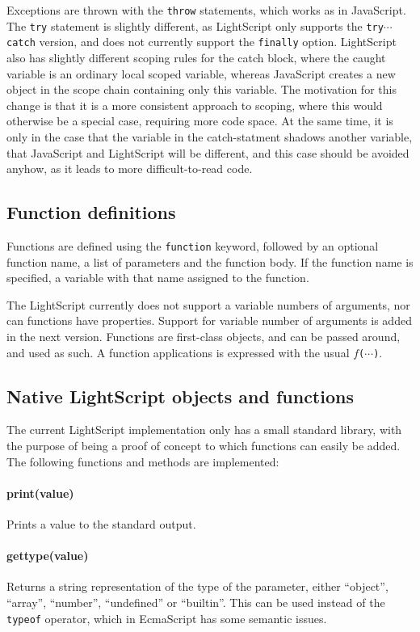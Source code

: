 \documentclass[11pt]{report}
\begin{document}
Exceptions are thrown with the \verb|throw| statements, which works as in JavaScript.
The \verb|try| statement is slightly different, as LightScript only supports the \verb|try|$\cdots$\verb|catch| version, and does not currently support the \verb|finally| option.
LightScript also has slightly different scoping rules for the catch block, where the caught variable is an ordinary local scoped variable, whereas JavaScript creates a new object in the scope chain containing only this variable. The motivation for this change is that it is a more consistent approach to scoping, where this would otherwise be a special case, requiring more code space. 
At the same time, it is only in the case that the variable in the catch-statment shadows another variable, that JavaScript and LightScript will be different, and this case should be avoided anyhow, as it leads to more difficult-to-read code. 

\subsection{Function definitions}
Functions are defined using the \verb|function| keyword, followed by an optional function name, a list of parameters and the function body.
If the function name is specified, a variable with that name assigned to the function.

The LightScript currently does not support a variable numbers of arguments, nor can functions have properties.
Support for variable number of arguments is added in the next version.
Functions are first-class objects, and can be passed around, and used as such. A function applications is expressed with the usual $f$\verb|(|$\cdots$\verb|)|.

\subsection{Native LightScript objects and functions}
The current LightScript implementation only has a small standard library, with the purpose of being a proof of concept to which functions can easily be added. The following functions and methods are implemented:

\paragraph{print(value)} Prints a value to the standard output.
\paragraph{gettype(value)} Returns a string representation of the type of the parameter, either ``object'', ``array'', ``number'', ``undefined'' or ``builtin''. This can be used instead of the \verb|typeof| operator, which in EcmaScript has some semantic issues.
\end{document}
